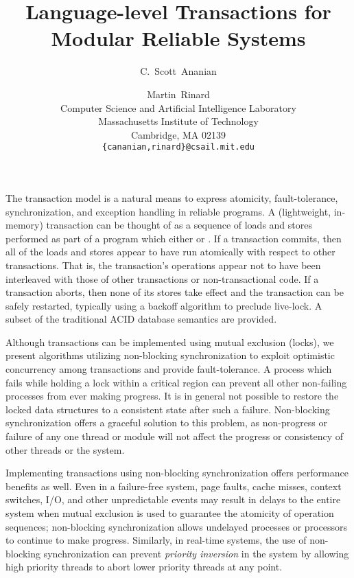 \documentclass[twoside,twocolumn,notitlepage,letterpaper]{article}
\title{Language-level Transactions for Modular Reliable Systems}
\author{C.~Scott~Ananian \and Martin~Rinard \\
Computer Science and Artificial Intelligence Laboratory\\
Massachusetts Institute of Technology\\ 
Cambridge, MA 02139 \\
\texttt{\{cananian,rinard\}@csail.mit.edu}
}
\date{}
\begin{document}
\maketitle
{}

The transaction model is a natural means to express atomicity,
fault-tolerance, synchronization, and exception handling in reliable
programs.  A (lightweight, in-memory) transaction can be thought of as
a sequence of loads and
stores performed as part of a program which either  or
.  If a transaction commits, then all of the loads and
stores appear to have run atomically with respect to other
transactions.  That is, the transaction's operations appear not to
have been interleaved with those of other transactions or
non-transactional code.  If a transaction aborts, then none of its
stores take effect and the transaction can be safely restarted,
typically using a backoff algorithm to preclude live-lock.
A subset of the traditional ACID database semantics are provided.

Although transactions can be implemented using mutual exclusion
(locks), we present algorithms utilizing non-blocking synchronization
to exploit optimistic concurrency among transactions and provide
fault-tolerance.  A process which fails while holding a lock within a
critical region can prevent all other non-failing processes from ever
making progress.  It is in general not possible to restore the locked
data structures to a consistent state after such a failure.
Non-blocking synchronization offers a graceful solution to this
problem, as non-progress or failure of any one thread or module will
not affect the progress or consistency of other threads or the system.

Implementing transactions using non-blocking synchronization offers
performance benefits as well.  Even in a failure-free system, page
faults, cache misses, context switches, I/O, and other unpredictable
events may result in delays to the entire system when mutual exclusion
is used to guarantee the atomicity of operation sequences;
non-blocking synchronization allows undelayed processes or processors
to continue to make progress.  Similarly, in real-time systems, the
use of non-blocking synchronization can prevent \emph{priority
  inversion} in the system by allowing high priority threads to abort
lower priority threads at any point.
\end{document}

